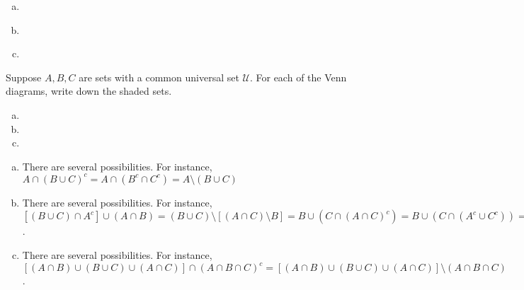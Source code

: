 \documentclass[11pt,letterpaper]{article}
\begin{document}
\sol
\begin{enumerate}[(a)]
\item \phantom{.}\par
	\begin{venndiagram2sets}[tikzoptions={scale=1}]
	\fillOnlyA
	\end{venndiagram2sets}

\item \phantom{.}\par
	\begin{venndiagram2sets}[tikzoptions={scale=1}]
	\fillNotAorB
	\end{venndiagram2sets}

\item \phantom{.}\par
	\begin{venndiagram2sets}[tikzoptions={scale=1}]
	\fillOnlyA
	\fillOnlyB
	\end{venndiagram2sets}
\end{enumerate}





\newpage





 Suppose $A, B, C$ are sets with a common universal set $\mathscr{U}$. For each of the Venn diagrams, write down the shaded sets.  
	\begin{enumerate}[(a)]
	\item \diagramOne
	\item \diagramTwo
	\item \diagramThree
	\end{enumerate} \pspace

\sol
\begin{enumerate}[(a)]
\item There are several possibilities. For instance, $A \cap (B \cup C)^c= A \cap (B^c \cap C^c)= A \setminus (B \cup C)$

\item There are several possibilities. For instance, $[(B \cup C) \cap A^c] \cup (A \cap B)= (B \cup C) \setminus [ (A \cap C) \setminus B]= B \cup (C \cap (A \cap C)^c)= B \cup (C \cap (A^c \cup C^c))= B \cup (A^c \cap C)$. 

\item There are several possibilities. For instance, $[(A \cap B) \cup (B \cup C) \cup (A \cap C)] \cap (A \cap B \cap C)^c= [(A \cap B) \cup (B \cup C) \cup (A \cap C)] \setminus (A \cap B \cap C)$. 
\end{enumerate}
\end{document}
